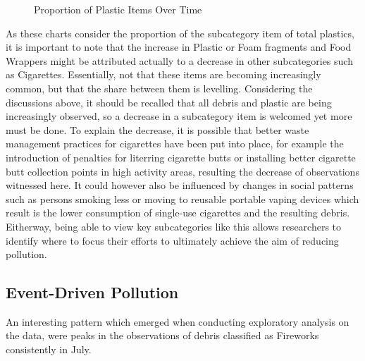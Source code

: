\documentclass[10pt]{article}\usepackage[]{graphicx}\usepackage[]{color}
\newenvironment{knitrout}{}{} %
\begin{document}
\begin{figure}[H]
\begin{center}
\begin{knitrout}
\end{knitrout}
\caption {Proportion of Plastic Items Over Time}
\label{figF4}
\end {center}
\end {figure}


As these charts consider the proportion of the subcategory item of total plastics, it is important to note that the increase in Plastic or Foam fragments and Food Wrappers might be attributed actually to a decrease in other subcategories such as Cigarettes. Essentially, not that these items are becoming increasingly common, but that the share between them is levelling. Considering the discussions above, it should be recalled that all debris and plastic are being increasingly observed, so a decrease in a subcategory item is welcomed yet more must be done. To explain the decrease, it is possible that better waste management practices for cigarettes have been put into place, for example the introduction of penalties for literring cigarette butts or installing better cigarette butt collection points in high activity areas, resulting the decrease of observations witnessed here. It could however also be influenced by changes in social patterns such as persons smoking less or moving to reusable portable vaping devices which result is the lower consumption of single-use cigarettes and the resulting debris. Eitherway, being able to view key subcategories like this allows researchers to identify where to focus their efforts to ultimately achieve the aim of reducing pollution. 

\pagebreak
\subsection{Event-Driven Pollution}

An interesting pattern which emerged when conducting exploratory analysis on the data, were peaks in the observations of debris classified as Fireworks consistently in July.\\
\end{document}
